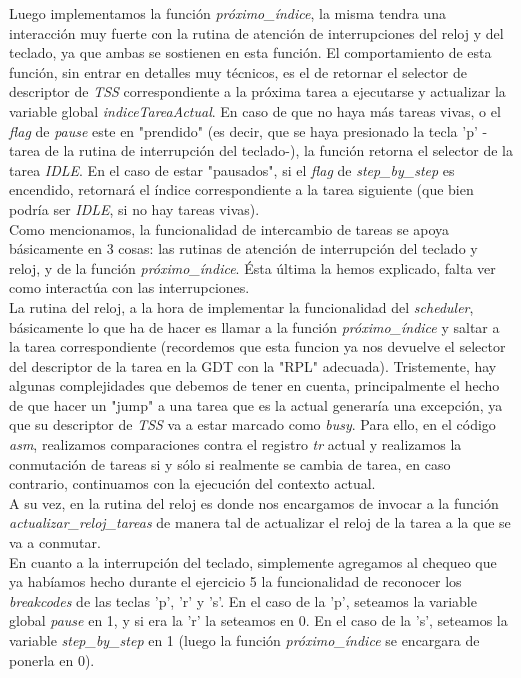 Luego implementamos la función \textit{próximo\_índice}, la misma tendra una interacción muy fuerte con la rutina de atención de interrupciones del reloj y del teclado, ya que ambas se sostienen en esta función. El comportamiento de esta función, sin entrar en detalles muy técnicos, es el de retornar el selector de descriptor de \textit{TSS} correspondiente a la próxima tarea a ejecutarse y actualizar la variable global \textit{indiceTareaActual}. En caso de que no haya más tareas vivas, o el \textit{flag} de \textit{pause} este en "prendido" (es decir, que se haya presionado la tecla 'p' -tarea de la rutina de interrupción del teclado-), la función retorna el selector de la tarea \textit{IDLE}. En el caso de estar "pausados", si el \textit{flag} de \textit{step\_by\_step} es encendido, retornará el índice correspondiente a la tarea siguiente (que bien podría ser \textit{IDLE}, si no hay tareas vivas).\\

Como mencionamos, la funcionalidad de intercambio de tareas se apoya básicamente en 3 cosas: las rutinas de atención de interrupción del teclado y reloj, y de la función \textit{próximo\_índice}. Ésta última la hemos explicado, falta ver como interactúa con las interrupciones.\\

La rutina del reloj, a la hora de implementar la funcionalidad del \textit{scheduler}, básicamente lo que ha de hacer es llamar a la función \textit{próximo\_índice} y saltar a la tarea correspondiente (recordemos que esta funcion ya nos devuelve el selector del descriptor de la tarea en la GDT con la "RPL" adecuada). Tristemente, hay algunas complejidades que debemos de tener en cuenta, principalmente el hecho de que hacer un "jump" a una tarea que es la actual generaría una excepción, ya que su descriptor de \textit{TSS} va a estar marcado como \textit{busy}. Para ello, en el código \textit{asm}, realizamos comparaciones contra el registro \textit{tr} actual y realizamos la conmutación de tareas si y sólo si realmente se cambia de tarea, en caso contrario, continuamos con la ejecución del contexto actual.\\

A su vez, en la rutina del reloj es donde nos encargamos de invocar a la función \textit{actualizar\_reloj\_tareas} de manera tal de actualizar el reloj de la tarea a la que se va a conmutar.\\

En cuanto a la interrupción del teclado, simplemente agregamos al chequeo que ya habíamos hecho durante el ejercicio 5 la funcionalidad de reconocer los \textit{breakcodes} de las teclas 'p', 'r' y 's'. En el caso de la 'p', seteamos la variable global \textit{pause} en 1, y si era la 'r' la seteamos en 0. En el caso de la 's', seteamos la variable \textit{step\_by\_step} en 1 (luego la función \textit{próximo\_índice} se encargara de ponerla en 0).\\

